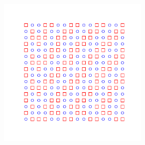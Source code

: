 \documentclass[handout]{beamer}
\begin{document}
\begin{frame}
\begin{figure}[h]
\begin{subfigure}{.48\textwidth}
    \includegraphics[width=0.8\textwidth]{figures/lin_split.pdf}
  \end{subfigure}
  \end{figure}
\end{frame}
\end{document}
